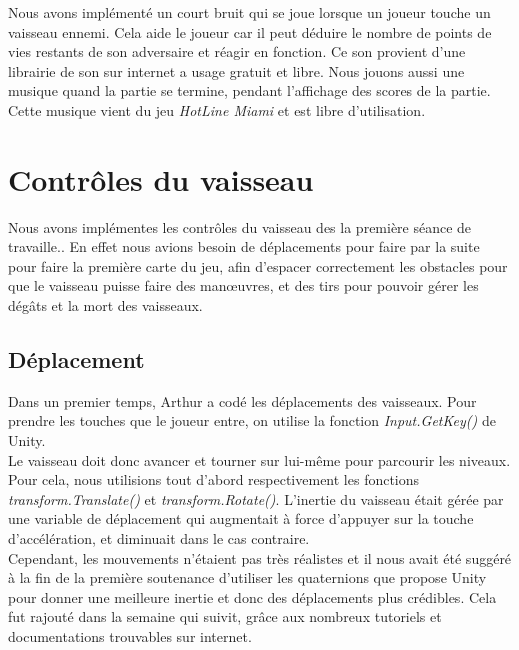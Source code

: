 \documentclass[12pt, titlepage]{article}
\begin{document}
\begin{spacing}{1.5}
Nous avons implémenté un court bruit qui se joue lorsque un joueur touche un vaisseau ennemi. Cela aide le joueur car il peut déduire le nombre de points de vies restants de son adversaire et réagir en fonction. Ce son provient d'une librairie de son sur internet a usage gratuit et libre. Nous jouons aussi une musique quand la partie se termine, pendant l'affichage des scores de la partie. Cette musique vient du jeu \textit{HotLine Miami} et est libre d'utilisation. \\


\newpage
\section{Contrôles du vaisseau}

Nous avons implémentes les contrôles du vaisseau des la première séance de travaille.. En effet nous avions besoin de déplacements pour faire par la suite pour faire la première carte du jeu, afin d'espacer correctement les obstacles pour que le vaisseau puisse faire des man\oe uvres, et des tirs pour pouvoir gérer les dégâts et la mort des vaisseaux.\\

\subsection{Déplacement}

Dans un premier temps, Arthur a codé les déplacements des vaisseaux. Pour prendre les touches que le joueur entre, on utilise la fonction \textit{Input.GetKey()} de Unity.\\

Le vaisseau doit donc avancer et tourner sur lui-même pour parcourir les niveaux. Pour cela, nous utilisions tout d'abord respectivement les fonctions \textit{transform.Translate()} et \textit{transform.Rotate()}. L'inertie du vaisseau était gérée par une variable de déplacement qui augmentait à force d'appuyer sur la touche d'accélération, et diminuait dans le cas contraire.\\

Cependant, les mouvements n'étaient pas très réalistes et il nous avait été suggéré à la fin de la première soutenance d'utiliser les quaternions que propose Unity pour donner une meilleure inertie et donc des déplacements plus crédibles. Cela fut rajouté dans la semaine qui suivit, grâce aux nombreux tutoriels et documentations trouvables sur internet.\\


\end{spacing}
\end{document}

